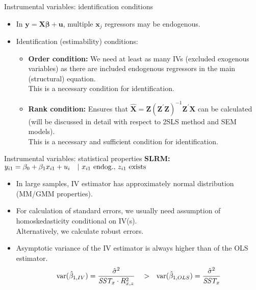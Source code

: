 \documentclass[usenames,dvipsnames]{beamer}
\begin{document}
\begin{frame}{Instrumental variables: identification conditions}
\begin{itemize} 
\item In $\bm{y} = \bm{X\beta}+\bm{u}$, multiple $\bm{x}_j$ regressors may be endogenous.
\medskip
\item Identification (estimability) conditions:
\medskip
\begin{itemize} 
\item \textbf{Order condition:} We need at least as many IVs (excluded exogenous variables) as there are included endogenous regressors in the main (structural) equation.  
\\ \medskip This is a necessary condition for identification. 
\bigskip
\item \textbf{Rank condition:} Ensures that $\hat{\bm{X}} = 
\bm{Z}(\bm{Z}^{\prime}\bm{Z})^{-1} \bm{Z}^{\prime}\bm{X}$ can be calculated (will be discussed in detail with respect to 2SLS method and SEM models).
\\ \medskip This is a necessary and sufficient condition for identification. 
\end{itemize}
\end{itemize}
\end{frame}
\begin{frame}{Instrumental variables: statistical properties}
\textbf{SLRM:} $y_{i1} = \beta_0 + \beta_1 x_{i1} + u_i \quad |~x_{i1} \textnormal{~endog.,~} z_{i1} \textnormal{~exists}$
\medskip
\begin{itemize}
\item In large samples, IV estimator has approximately normal distribution (MM/GMM properties). 
\medskip
\item For calculation of standard errors, we usually need assumption of homoskedasticity conditional on IV(s).\\ Alternatively, we calculate robust errors. 
\medskip
\item Asymptotic variance of the IV estimator is always higher than  of the OLS estimator. 
$$ \textnormal{var}(\hat{\beta}_{1,IV})=\frac{\hat{\sigma}^2}{\textit{SST}_{x} \cdot R^2_{x,z}} ~~~>~~
\textnormal{var}(\hat{\beta}_{1,OLS})=\frac{\hat{\sigma}^2}{\textit{SST}_x}$$
\end{itemize}
\end{frame}
\end{document}
